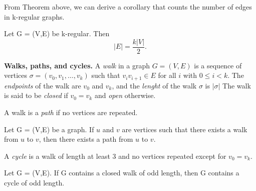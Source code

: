 \documentclass{tufte-handout}
\makeatletter
\renewcommand{\section}{\@startsection{section}%
    {3}{-1.01em}{-3ex \@plus -1ex \@minus -.2ex}%
    {1.5ex \@plus .2ex}
    {\hspace*{-5.5em}\fcolorbox{blue}{blue}{\parbox[c][1.0ex][b]{4em}{\phantom{space}}}
    \normalfont\Large\itshape\color{blue}}}
\makeatother
\begin{document}
From Theorem above, we can derive a corollary that counts the number of edges in k-regular graphs.

\begin{Corollary}
    Let G = (V,E) be k-regular. Then \[\left|E\right| = \frac{k\left|V\right|}{2}.\]
\end{Corollary}

\textbf{Walks, paths, and cycles.} A \textit{walk} in a graph \( G = (V,E) \)
is a sequence of vertices \( \sigma = (v_0, v_1, \ldots, v_k) \) such that \( v_i v_{i+1} \in E \) for all \( i \) with \( 0 \leq i < k \). 
The \textit{endpoints} of the walk are \( v_0 \) and \( v_k \), and the \textit{lenght} of the walk \( \sigma \) is \( \left|\sigma\right| \)
The walk is said to be \textit{closed} if \( v_0 = v_k \) and \textit{open} otherwise. 
\clearpage

A walk is a \textit{path} if no vertices are repeated. 
\begin{Theorem}
    Let G = (V,E) be a graph. If \( u \) and \( v \) are 
    vertices such that there exists a walk from \( u \) to \( v \), then there exists a path from \( u \) to \( v \).
\end{Theorem}

A \textit{cycle} is a walk of length at least 3 and no vertices repeated except for \( v_0 = v_k \).

\begin{Proposition}
    Let G = (V,E). If G contains a closed walk of odd length, then G contains a cycle of odd length.
\end{Proposition}


\makeatletter
  \renewcommand{\section}{\@startsection{section}%
    {3}{0.8em}{-3ex \@plus -1ex \@minus -.2ex}%
    {1.5ex \@plus .2ex}
    {\hspace*{-5.5em}\fcolorbox{Periwinkle}{Periwinkle}{\parbox[c][1.0ex][b]{4em}{\phantom{space}}}
    \normalfont\Large\itshape\color{blue}}}
\makeatother



\end{document}
